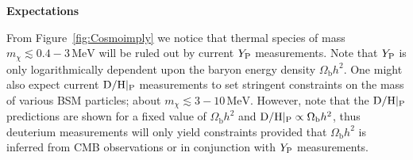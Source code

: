 \vspace{1cm}
\noindent\textbf{Expectations}

\noindent From Figure~\ref{fig:Cosmoimply} we notice that thermal species of mass $m_\chi \lesssim 0.4-3\,\text{MeV}$ will be ruled out by current $Y_{\rm P}$ measurements. Note that $Y_{\rm P}$ is only logarithmically dependent upon the baryon energy density $\Omega_{\mathrm{b}}h^2$. One might also expect current ${\rm D/H}|_{\rm P}$ measurements to set stringent constraints on the mass of various BSM particles; about $m_\chi \lesssim 3-10\,\text{MeV}$. However, note that the ${\rm D/H}|_{\rm P}$ predictions are shown for a fixed value of $\Omega_{\mathrm{b}} h^2$ and ${\rm D/H}|_{\rm P} \propto \Omega_{\mathrm{b}} h^2$, thus deuterium measurements will only yield constraints provided that $\Omega_{\mathrm{b}} h^2$ is inferred from CMB observations or in conjunction with $Y_{\rm P}$ measurements.


